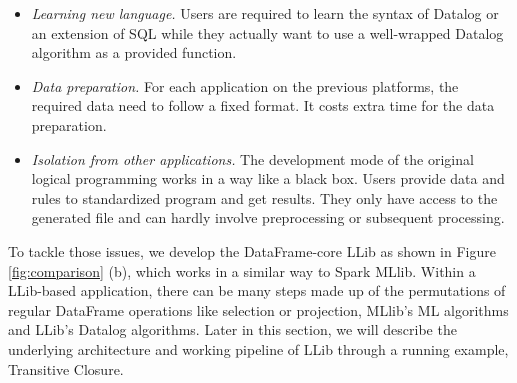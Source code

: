 \begin{itemize}
	\item \textit{Learning new language.} Users are required to learn the syntax of Datalog or an extension of SQL while they actually  want to use a well-wrapped Datalog algorithm as a provided function.
	\item \textit{Data preparation.} For each application on the previous platforms, the required data need to follow a fixed format. It costs extra time for the data preparation.
	\item \textit {Isolation from other applications.} The development mode  of the original logical programming works in a way like a black box. Users provide data and rules to standardized program and get results. They only have access to the generated file and can hardly involve  preprocessing or subsequent processing.  
\end{itemize}

To tackle those issues, we develop the DataFrame-core LLib as shown in Figure \ref{fig:comparison} (b), which works in a similar way to Spark MLlib. Within a LLib-based application, there can be many steps made up of the permutations of regular DataFrame operations like selection or projection,  MLlib's ML algorithms and LLib's Datalog algorithms. Later in this section, we will describe the underlying architecture and working pipeline of LLib through a running example, Transitive Closure. 

